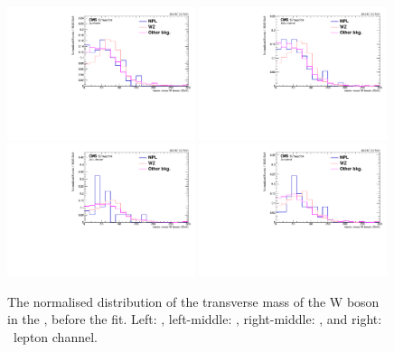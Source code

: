 \begin{figure}[htbp]
	\centering
	\includegraphics[width=0.49\textwidth]{6_Search/Figures/MTWnormalised/MTW_uuu_Normalized}
	\includegraphics[width=0.49\textwidth]{6_Search/Figures/MTWnormalised/MTW_uue_Normalized}
	\includegraphics[width=0.49\textwidth]{6_Search/Figures/MTWnormalised/MTW_eeu_Normalized}
	\includegraphics[width=0.49\textwidth]{6_Search/Figures/MTWnormalised/MTW_eee_Normalized}
	\caption{The normalised distribution of the transverse mass of the W boson in the \WZCR, before the fit. Left: \mumumu, left-middle: \emumu, right-middle: \eemu, and right: \eee\ lepton channel.  }
	\label{fig:mtwnorm}
\end{figure}

